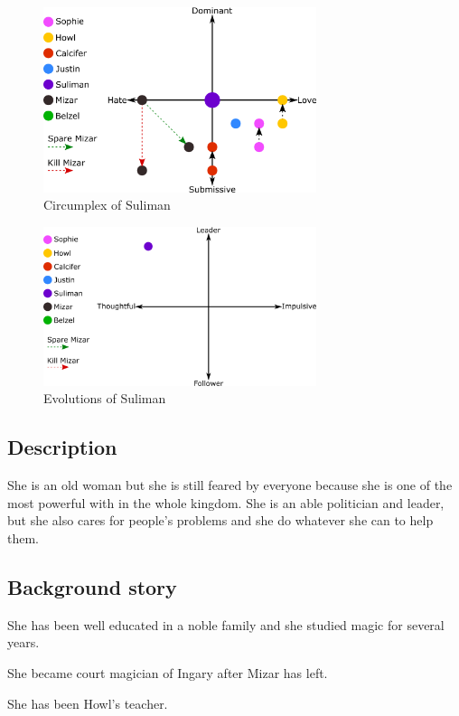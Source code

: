 \begin{figure}[H]
  \centering
  \includegraphics[width=8cm]{Images/SVG/Exported/Circumplexes/sulimanCircumplex}
  \caption{Circumplex of Suliman}
\end{figure}

\begin{figure}[H]
  \centering
   \includegraphics[width=8cm]{Images/SVG/Exported/Evolutions/sulimanEvolution}
  \caption{Evolutions of Suliman}
\end{figure}

\subsection{Description}
She is an old woman but she is still feared by everyone because she is one of the most powerful with in the whole kingdom. She is an able politician and leader, but she also cares for people's problems and she do whatever she can to help them.

\subsection{Background story}
She has been well educated in a noble family and she studied magic for several years.

She became court magician of Ingary after Mizar has left.

She has been Howl’s teacher.
